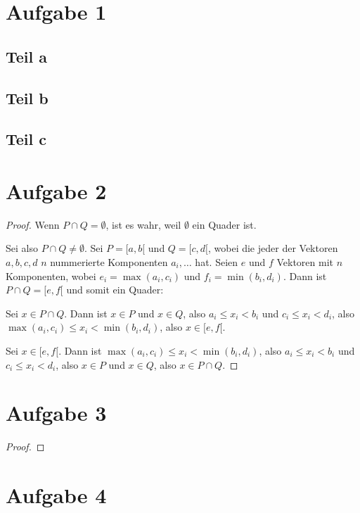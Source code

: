 \documentclass[10pt,a4paper]{article}
\begin{document}
\section{Aufgabe 1}
\subsection{Teil a}
\subsection{Teil b}
\subsection{Teil c}

\section{Aufgabe 2}
\begin{proof}
  Wenn $P \cap Q = \emptyset$, ist es wahr, weil $\emptyset$ ein Quader ist.

  Sei also $P \cap Q \ne \emptyset$.
  Sei $P = [a, b[$ und $Q = [c, d[$, wobei die jeder der Vektoren $a, b, c, d$ $n$ nummerierte Komponenten $a_{i}, \dots$ hat.
  Seien $e$ und $f$ Vektoren mit $n$ Komponenten, wobei $e_{i} = \max(a_{i}, c_{i})$ und $f_{i} = \min(b_{i}, d_{i})$.
  Dann ist $P \cap Q = [e, f[$ und somit ein Quader:
  
  Sei $x \in P \cap Q$.
  Dann ist $x \in P$ und $x \in Q$, also $a_{i} \le x_{i} < b_{i}$ und $c_{i} \le x_{i} < d_{i}$, also $\max(a_{i}, c_{i}) \le x_{i} < \min(b_{i}, d_{i})$, also $x \in [e, f[$.
  
  Sei $x \in [e, f[$.
  Dann ist $\max(a_{i}, c_{i}) \le x_{i} < \min(b_{i}, d_{i})$, also $a_{i} \le x_{i} < b_{i}$ und $c_{i} \le x_{i} < d_{i}$, also $x \in P$ und $x \in Q$, also $x \in P \cap Q$.
\end{proof}

\section{Aufgabe 3}
\begin{proof}
  
\end{proof}

\section{Aufgabe 4}
\end{document}
